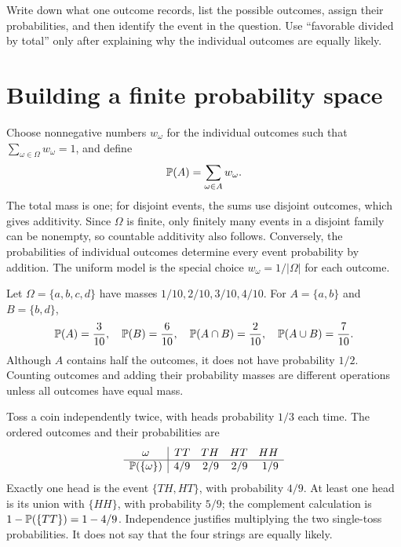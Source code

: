 \begin{checkpoint}[title={Build the model before taking a ratio}]
Write down what one outcome records, list the possible outcomes, assign
their probabilities, and then identify the event in the question.
Use ``favorable divided by total'' only after explaining why the
individual outcomes are equally likely.
\end{checkpoint}

\section{Building a finite probability space}

Choose nonnegative numbers $w_\omega$ for the individual outcomes such that
$\sum_{\omega\in\Omega}w_\omega=1$, and define
\[
  \P(A)=\sum_{\omega\in A}w_\omega.
\]
The total mass is one; for disjoint events, the sums use disjoint outcomes,
which gives additivity. Since $\Omega$ is finite, only finitely many events
in a disjoint family can be nonempty, so countable additivity also follows.
Conversely, the probabilities of individual outcomes determine every
event probability by addition. The uniform model is the special choice
$w_\omega=1/|\Omega|$ for each outcome.

\begin{example}
Let $\Omega=\{a,b,c,d\}$ have masses $1/10,2/10,3/10,4/10$.
For $A=\{a,b\}$ and $B=\{b,d\}$,
\[
\P(A)=\frac3{10},\quad \P(B)=\frac6{10},\quad
\P(A\cap B)=\frac2{10},\quad \P(A\cup B)=\frac7{10}.
\]
Although $A$ contains half the outcomes, it does not have probability
$1/2$. Counting outcomes and adding their probability masses are different
operations unless all outcomes have equal mass.
\end{example}

\begin{example}
Toss a coin independently twice, with heads probability $1/3$ each time.
The ordered outcomes and their probabilities are
\[
\begin{array}{c|rrrr}
\omega&TT&TH&HT&HH\\\hline
\P(\{\omega\})&4/9&2/9&2/9&1/9
\end{array}
\]
Exactly one head is the event $\{TH,HT\}$, with probability $4/9$.
At least one head is its union with $\{HH\}$, with probability $5/9$;
the complement calculation is $1-\P(\{TT\})=1-4/9$.
Independence justifies multiplying the two single-toss probabilities.
It does not say that the four strings are equally likely.
\end{example}

